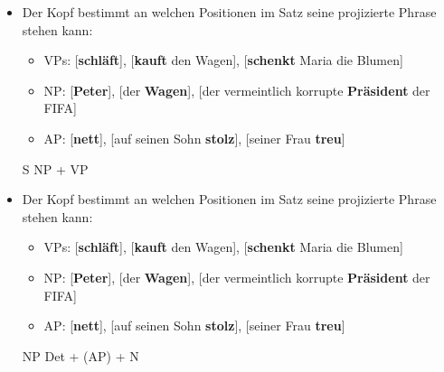 \begin{frame}

\begin{itemize}
	\item Der Kopf bestimmt an welchen Positionen im Satz seine projizierte Phrase stehen kann:
	\begin{itemize}
		\item VPs: [\textbf{schläft}], [\textbf{kauft} den Wagen], [\textbf{schenkt} Maria die Blumen]
		\item NP: [\textbf{Peter}], [der \textbf{Wagen}], [der vermeintlich korrupte \textbf{Präsident} der FIFA]
		\item AP: [\textbf{nett}], [auf seinen Sohn \textbf{stolz}], [seiner Frau \textbf{treu}]
\end{itemize}
	\pause

\eal S \ras NP + VP
\zl
	
	
\end{itemize}

\end{frame}


\begin{frame}

\begin{itemize}
	\item Der Kopf bestimmt an welchen Positionen im Satz seine projizierte Phrase stehen kann:
	\begin{itemize}
		\item VPs: [\textbf{schläft}], [\textbf{kauft} den Wagen], [\textbf{schenkt} Maria die Blumen]
		\item NP: [\textbf{Peter}], [der \textbf{Wagen}], [der vermeintlich korrupte \textbf{Präsident} der FIFA]
		\item AP: [\textbf{nett}], [auf seinen Sohn \textbf{stolz}], [seiner Frau \textbf{treu}]
\end{itemize}
	\pause

\eal NP \ras Det + (AP) + N
\zl
	
	
\end{itemize}

\end{frame}

